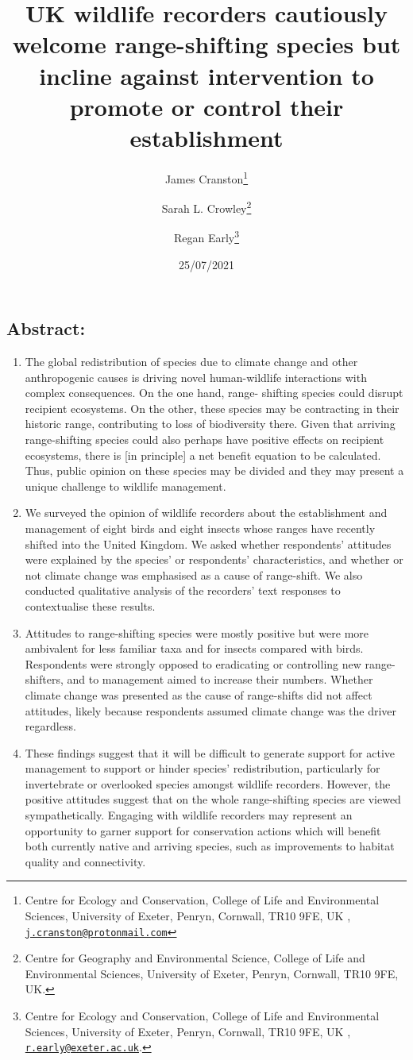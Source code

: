 \documentclass[
]{article}
\title{UK wildlife recorders cautiously welcome range-shifting species
but incline against intervention to promote or control their
establishment}
\author{James Cranston\footnote{Centre for Ecology and Conservation,
  College of Life and Environmental Sciences, University of Exeter,
  Penryn, Cornwall, TR10 9FE, UK ,
  \href{mailto:j.cranston@protonmail.com}{\nolinkurl{j.cranston@protonmail.com}}} \and Sarah
L. Crowley\footnote{Centre for Geography and Environmental Science,
  College of Life and Environmental Sciences, University of Exeter,
  Penryn, Cornwall, TR10 9FE, UK.} \and Regan Early\footnote{Centre for
  Ecology and Conservation, College of Life and Environmental Sciences,
  University of Exeter, Penryn, Cornwall, TR10 9FE, UK ,
  \href{mailto:r.early@exeter.ac.uk}{\nolinkurl{r.early@exeter.ac.uk}}.}}
\date{25/07/2021}
\providecommand{\tightlist}{%
  \setlength{\itemsep}{0pt}\setlength{\parskip}{0pt}}
\begin{document}
\maketitle

\hypertarget{abstract}{%
\subsection{Abstract:}\label{abstract}}

\begin{enumerate}
\def\labelenumi{\arabic{enumi}.}
\tightlist
\item
  The global redistribution of species due to climate change and other
  anthropogenic causes is driving novel human-wildlife interactions with
  complex consequences. On the one hand, range- shifting species could
  disrupt recipient ecosystems. On the other, these species may be
  contracting in their historic range, contributing to loss of
  biodiversity there. Given that arriving range-shifting species could
  also perhaps have positive effects on recipient ecosystems, there is
  {[}in principle{]} a net benefit equation to be calculated. Thus,
  public opinion on these species may be divided and they may present a
  unique challenge to wildlife management.\\
\item
  We surveyed the opinion of wildlife recorders about the establishment
  and management of eight birds and eight insects whose ranges have
  recently shifted into the United Kingdom. We asked whether
  respondents' attitudes were explained by the species' or respondents'
  characteristics, and whether or not climate change was emphasised as a
  cause of range-shift. We also conducted qualitative analysis of the
  recorders' text responses to contextualise these results.\\
\item
  Attitudes to range-shifting species were mostly positive but were more
  ambivalent for less familiar taxa and for insects compared with birds.
  Respondents were strongly opposed to eradicating or controlling new
  range-shifters, and to management aimed to increase their numbers.
  Whether climate change was presented as the cause of range-shifts did
  not affect attitudes, likely because respondents assumed climate
  change was the driver regardless.\\
\item
  These findings suggest that it will be difficult to generate support
  for active management to support or hinder species' redistribution,
  particularly for invertebrate or overlooked species amongst wildlife
  recorders. However, the positive attitudes suggest that on the whole
  range-shifting species are viewed sympathetically. Engaging with
  wildlife recorders may represent an opportunity to garner support for
  conservation actions which will benefit both currently native and
  arriving species, such as improvements to habitat quality and
  connectivity.
\end{enumerate}
\end{document}
